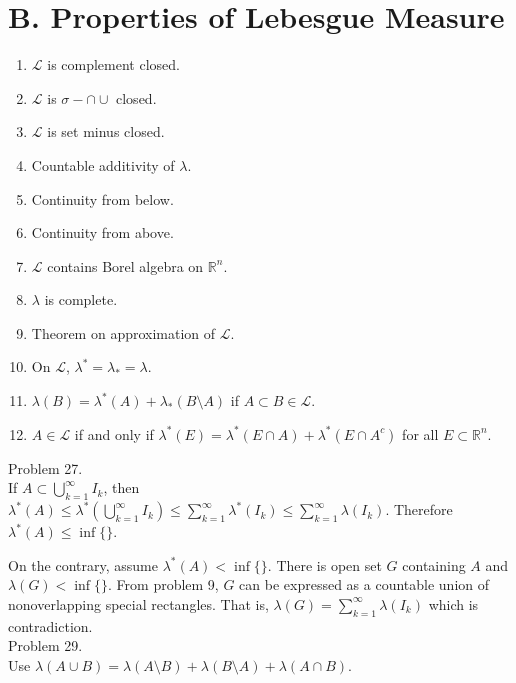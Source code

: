 \section*{B. Properties of Lebesgue Measure}

\begin{enumerate}
	\item $\mathcal{L}$ is complement closed.
	\item $\mathcal{L}$ is $\sigma - \cap \cup$ closed.
	\item $\mathcal{L}$ is set minus closed.
	\item Countable additivity of $\lambda$.
	\item Continuity from below.
	\item Continuity from above.
	\item $\mathcal{L}$ contains Borel algebra on $\mathbb{R}^n$.
	\item $\lambda$ is complete.
	\item Theorem on approximation of $\mathcal{L}$.
	\item On $\mathcal{L}$, $\lambda ^{*} = \lambda_{*} = \lambda$.
	\item $\lambda(B) = \lambda^{*}(A) + \lambda_{*}(B\setminus A)$ if $A \subset B \in \mathcal{L}$.
	\item $A\in \mathcal{L}$ if and only if $\lambda^{*}(E) = \lambda^{*}(E\cap A)+\lambda^{*}(E\cap A^{c})$ for all $E \subset \mathbb{R}^n$.
\end{enumerate}

Problem 27. \\

If $A \subset \bigcup_{k=1}^{\infty}I_{k}$, then $\lambda^{*}(A) \leq \lambda^{*}(\bigcup_{k=1}^{\infty}I_{k}) \leq \sum_{k=1}^{\infty}\lambda^{*}(I_{k}) \leq \sum_{k=1}^{\infty}\lambda(I_{k})$. Therefore $\lambda^{*}(A) \leq \inf{\{\} }$.

On the contrary, assume $\lambda^{*}(A) < \inf{ \{ \} }$. There is open set $G$ containing $A$ and $\lambda(G) < \inf{ \{ \} }$. From problem 9, $G$ can be expressed as a countable union of nonoverlapping special rectangles. That is, $\lambda(G) = \sum_{k=1}^{\infty}\lambda(I_{k})$ which is contradiction.\\

Problem 29. \\

Use $\lambda(A \cup B) = \lambda(A \setminus B) + \lambda(B \setminus A) + \lambda(A\cap B)$.\\


